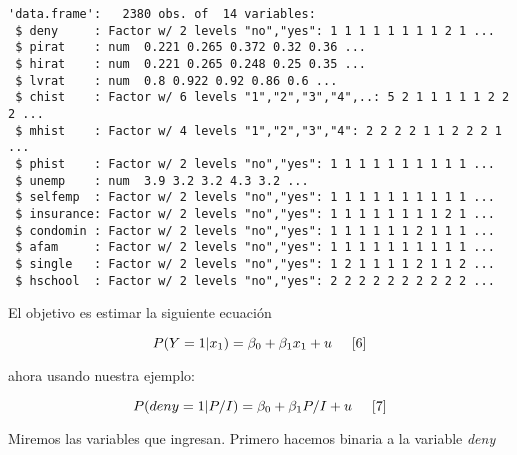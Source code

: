 \documentclass[
  letterpaper,
  DIV=11,
  numbers=noendperiod]{scrreprt}
\newenvironment{Shaded}{\begin{snugshade}}{\end{snugshade}}
\newcommand{\AttributeTok}[1]{\textcolor[rgb]{0.40,0.45,0.13}{#1}}
\newcommand{\CommentTok}[1]{\textcolor[rgb]{0.37,0.37,0.37}{#1}}
\newcommand{\DecValTok}[1]{\textcolor[rgb]{0.68,0.00,0.00}{#1}}
\newcommand{\FunctionTok}[1]{\textcolor[rgb]{0.28,0.35,0.67}{#1}}
\newcommand{\NormalTok}[1]{\textcolor[rgb]{0.00,0.23,0.31}{#1}}
\newcommand{\OtherTok}[1]{\textcolor[rgb]{0.00,0.23,0.31}{#1}}
\newcommand{\SpecialCharTok}[1]{\textcolor[rgb]{0.37,0.37,0.37}{#1}}
\newcommand{\StringTok}[1]{\textcolor[rgb]{0.13,0.47,0.30}{#1}}
\begin{document}
\begin{verbatim}
'data.frame':   2380 obs. of  14 variables:
 $ deny     : Factor w/ 2 levels "no","yes": 1 1 1 1 1 1 1 1 2 1 ...
 $ pirat    : num  0.221 0.265 0.372 0.32 0.36 ...
 $ hirat    : num  0.221 0.265 0.248 0.25 0.35 ...
 $ lvrat    : num  0.8 0.922 0.92 0.86 0.6 ...
 $ chist    : Factor w/ 6 levels "1","2","3","4",..: 5 2 1 1 1 1 1 2 2 2 ...
 $ mhist    : Factor w/ 4 levels "1","2","3","4": 2 2 2 2 1 1 2 2 2 1 ...
 $ phist    : Factor w/ 2 levels "no","yes": 1 1 1 1 1 1 1 1 1 1 ...
 $ unemp    : num  3.9 3.2 3.2 4.3 3.2 ...
 $ selfemp  : Factor w/ 2 levels "no","yes": 1 1 1 1 1 1 1 1 1 1 ...
 $ insurance: Factor w/ 2 levels "no","yes": 1 1 1 1 1 1 1 1 2 1 ...
 $ condomin : Factor w/ 2 levels "no","yes": 1 1 1 1 1 1 2 1 1 1 ...
 $ afam     : Factor w/ 2 levels "no","yes": 1 1 1 1 1 1 1 1 1 1 ...
 $ single   : Factor w/ 2 levels "no","yes": 1 2 1 1 1 1 2 1 1 2 ...
 $ hschool  : Factor w/ 2 levels "no","yes": 2 2 2 2 2 2 2 2 2 2 ...
\end{verbatim}

El objetivo es estimar la siguiente ecuación

\[
P(Y=1|x_1)=\beta_0+\beta_1x_1+u \hspace{0.5cm} [6]
\]

ahora usando nuestra ejemplo:

\[
P(deny=1|P/I)=\beta_0+\beta_1P/I+u\hspace{0.5cm} [7]
\]

Miremos las variables que ingresan. Primero hacemos binaria a la
variable \emph{deny}

\begin{Shaded}
\end{Shaded}
\end{document}
